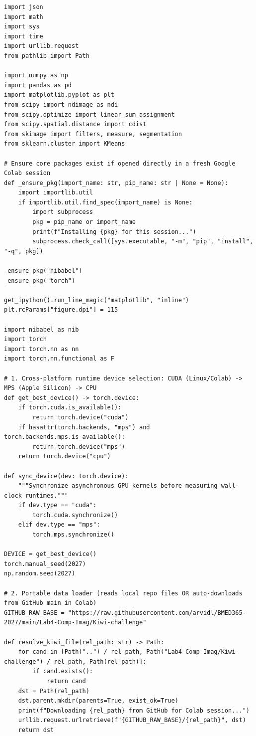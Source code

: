 \documentclass[10pt,a4paper]{article}
\begin{document}
\begin{codebox}
\begin{lstlisting}[style=pybmed]
import json
import math
import sys
import time
import urllib.request
from pathlib import Path

import numpy as np
import pandas as pd
import matplotlib.pyplot as plt
from scipy import ndimage as ndi
from scipy.optimize import linear_sum_assignment
from scipy.spatial.distance import cdist
from skimage import filters, measure, segmentation
from sklearn.cluster import KMeans

# Ensure core packages exist if opened directly in a fresh Google Colab session
def _ensure_pkg(import_name: str, pip_name: str | None = None):
    import importlib.util
    if importlib.util.find_spec(import_name) is None:
        import subprocess
        pkg = pip_name or import_name
        print(f"Installing {pkg} for this session...")
        subprocess.check_call([sys.executable, "-m", "pip", "install", "-q", pkg])

_ensure_pkg("nibabel")
_ensure_pkg("torch")

get_ipython().run_line_magic("matplotlib", "inline")
plt.rcParams["figure.dpi"] = 115

import nibabel as nib
import torch
import torch.nn as nn
import torch.nn.functional as F

# 1. Cross-platform runtime device selection: CUDA (Linux/Colab) -> MPS (Apple Silicon) -> CPU
def get_best_device() -> torch.device:
    if torch.cuda.is_available():
        return torch.device("cuda")
    if hasattr(torch.backends, "mps") and torch.backends.mps.is_available():
        return torch.device("mps")
    return torch.device("cpu")

def sync_device(dev: torch.device):
    """Synchronize asynchronous GPU kernels before measuring wall-clock runtimes."""
    if dev.type == "cuda":
        torch.cuda.synchronize()
    elif dev.type == "mps":
        torch.mps.synchronize()

DEVICE = get_best_device()
torch.manual_seed(2027)
np.random.seed(2027)

# 2. Portable data loader (reads local repo files OR auto-downloads from GitHub main in Colab)
GITHUB_RAW_BASE = "https://raw.githubusercontent.com/arvidl/BMED365-2027/main/Lab4-Comp-Imag/Kiwi-challenge"

def resolve_kiwi_file(rel_path: str) -> Path:
    for cand in [Path("..") / rel_path, Path("Lab4-Comp-Imag/Kiwi-challenge") / rel_path, Path(rel_path)]:
        if cand.exists():
            return cand
    dst = Path(rel_path)
    dst.parent.mkdir(parents=True, exist_ok=True)
    print(f"Downloading {rel_path} from GitHub for Colab session...")
    urllib.request.urlretrieve(f"{GITHUB_RAW_BASE}/{rel_path}", dst)
    return dst


\end{lstlisting}
\end{codebox}
\end{document}
